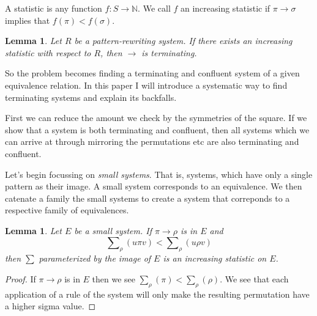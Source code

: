 \documentclass[a4paper, 11pt]{article}
\newtheorem{lemma}[theorem]{Lemma}
\theoremstyle{definition}
\begin{document}
A statistic is any function $f : S \to \mathbb{N}$. We call $f$ an increasing
statistic if $\pi \to \sigma$ implies that $f(\pi) < f(\sigma)$.

\begin{lemma}
    Let $R$ be a pattern-rewriting system. If there exists an increasing
    statistic with respect to $R$, then $\to$ is terminating.    
\end{lemma}

So the problem becomes finding a terminating and confluent system of a given
equivalence relation. In this paper I will introduce a systematic way to find
terminating systems and explain its backfalls.

First we can reduce the amount we check by the symmetries of the square.
If we show that a system is both terminating and confluent, then all systems
which we can arrive at through mirroring the permutations etc are also
terminating and confluent.

Let's begin focussing on \emph{small systems}. That is, systems, which have only
a single pattern as their image. A small system corresponds to an equivalence.
We then catenate a family the small systems to create a system that correponds
to a respective family of equivalences.

\begin{lemma}
    Let $E$ be a small system. If $\pi \to \rho$ is in $E$ and 
    \begin{equation}
        \sum\nolimits_\rho(u\pi v) < \sum\nolimits_\rho(u \rho v)
    \end{equation}
    then $\sum$ parameterized by the image of $E$ is an increasing statistic on
    $E$.
\end{lemma}
\begin{proof}
    If $\pi \to \rho$ is in $E$ then we see $\sum_\rho(\pi) <
    \sum_\rho(\rho)$.  We see that each application of a rule of the system
    will only make the resulting permutation have a higher sigma value.
\end{proof}
\end{document}
